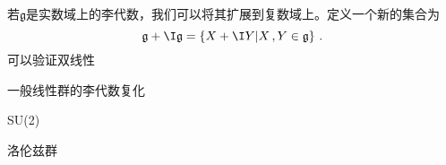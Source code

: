 

\begin{definition}{}
若$\mathfrak g$是实数域上的李代数，我们可以将其扩展到复数域上。定义一个新的集合为
\begin{equation}
\mathfrak g+\I \mathfrak g=\{X+\I Y|X\,,Y\in\mathfrak g\}~.
\end{equation}
可以验证双线性
\end{definition}
\begin{example}{一般线性群的李代数复化}

\end{example}
\begin{example}{SU(2)}

\end{example}
\begin{example}{洛伦兹群}

\end{example}
